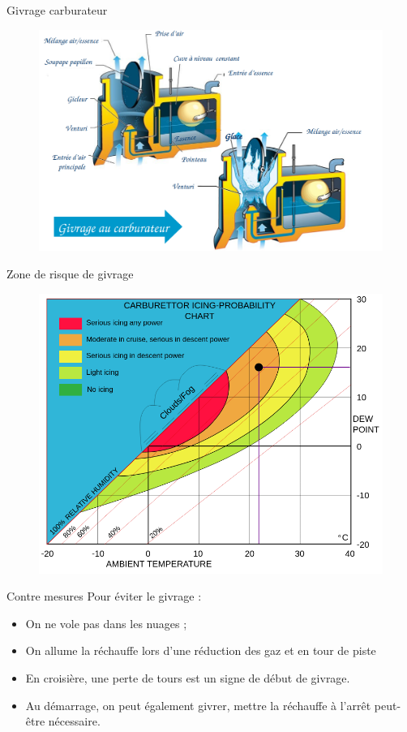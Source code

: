 \documentclass{beamer}
\begin{document}
\begin{frame}{Givrage carburateur} 
  \begin{figure}
    \centering
    \includegraphics[scale=1]{images/carburateur.png}
  \end{figure}
\end{frame}


\begin{frame}{Zone de risque de givrage}
  \begin{figure}
    \centering
    \includegraphics[scale=1.5]{images/icing.png}
  \end{figure}
\end{frame}

\begin{frame}{Contre mesures}
  Pour éviter le givrage :\pause
  \begin{itemize}
    \item On ne vole pas dans les nuages ; \pause
    \item On allume la réchauffe lors d'une réduction des gaz et en tour de piste \pause
    \item En croisière, une perte de tours est un signe de début de givrage. \pause
    \item Au démarrage, on peut également givrer, mettre la réchauffe à l'arrêt peut-être nécessaire.
  \end{itemize}
  
\end{frame}
\end{document}

